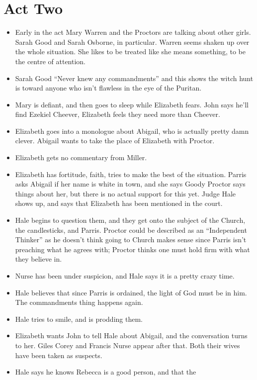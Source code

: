 \documentclass[10pt]{article}
\begin{document}
\section{Act Two}
\begin{itemize}
	\item Early in the act Mary Warren and the Proctors are talking about
		other girls.  Sarah Good and Sarah Osborne, in particular.  Warren 
		seems shaken up	over the whole situation.  She likes to be treated 
		like she means something, to be the centre of attention.
	\item Sarah Good ``Never knew any commandments'' and this shows the 
		witch hunt is toward anyone who isn't flawless in the eye of the
		Puritan.
	\item Mary is defiant, and then goes to sleep while Elizabeth fears.
		John says he'll find Ezekiel Cheever, Elizabeth feels they need more
		than Cheever.
	\item Elizabeth goes into a monologue about Abigail, who is actually
		pretty damn clever.  Abigail wants to take the place of Elizabeth
		with Proctor.
	\item Elizabeth gets no commentary from Miller.
	\item Elizabeth has fortitude, faith, tries to make the best of the
		situation.  Parris asks Abigail if her name is white in town, 
		and she says Goody Proctor says things about her, but there is no
		actual support for this yet.  Judge Hale shows up, and says that
		Elizabeth has been mentioned in the court.
	\item Hale begins to question them, and they get onto the subject
		of the Church, the candlesticks, and Parris.  Proctor could be
		described as an ``Independent Thinker''  as he doesn't think
		going to Church makes sense since Parris isn't preaching what he
		agrees with; Proctor thinks one must hold firm with what they
		believe in.
	\item Nurse has been under suspicion, and Hale says it is a pretty
		crazy time.
	\item Hale believes that since Parris is ordained, the light of God
		must be in him.  The commandments thing happens again.
	\item Hale tries to smile, and is prodding them.
	\item Elizabeth wants John to tell Hale about Abigail, and the
		conversation turns to her.  Giles Corey and Francis Nurse appear
		after that.  Both their wives have been taken as suspects.
	\item Hale says he knows Rebecca is a good person, and that the 

\end{itemize}
\end{document}
